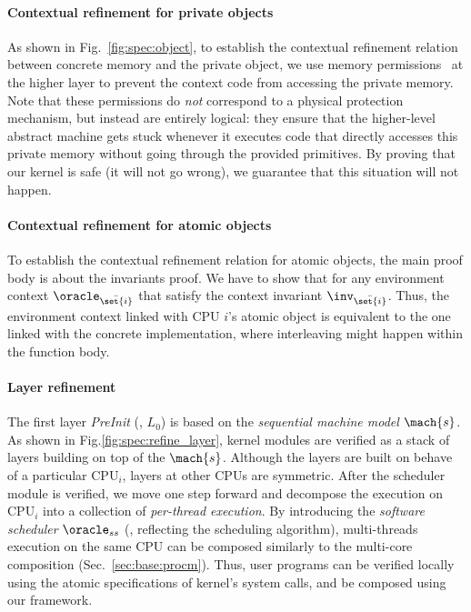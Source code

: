 {\paragraph{Contextual refinement for private objects}
As shown in Fig.~\ref{fig:spec:object},
to establish the contextual refinement relation
between concrete memory and the private object,
we use memory permissions~\cite{leroy08} at the higher layer
to prevent the context code
from accessing the private memory.
Note that these permissions do \emph{not}
correspond to a physical protection mechanism,
but instead are entirely logical:
they ensure that the higher-level abstract machine
gets stuck whenever it executes
code that directly accesses this private memory without going through the provided
primitives. By proving that our kernel is safe (it will not go wrong),
we guarantee that this situation will not happen.

\paragraph{Contextual refinement for atomic objects}
To establish the contextual refinement relation
for atomic objects, the main proof body is about the invariants proof.
We have to show that for any environment context $\oracle_{\bar{\set{i}}}$
that satisfy the context invariant $\inv_{\bar{\set{i}}}$.
Thus, the environment context linked with CPU $i$'s atomic object
is equivalent to the one linked with the concrete implementation,
where interleaving might happen within the function body.

\paragraph{Layer refinement}


The first layer \emph{PreInit} (\ie, $L_0$)
is based on the \emph{sequential machine model} $\mach{s}$.
As shown in Fig.\ref{fig:spec:refine_layer},
kernel modules
are verified as a stack of layers
building 
on top of the $\mach{s}$.
Although the layers are built
on behave of a particular $\text{CPU}_i$,
layers at other CPUs are symmetric.
After the scheduler module is verified,
we move one step forward
and decompose the execution on $\text{CPU}_i$
into a collection of \emph{per-thread execution}.
By introducing the \emph{software scheduler}
$\oracle_{ss}$ (\ie, reflecting the scheduling algorithm),
multi-threads execution on the same CPU 
can be composed similarly to the multi-core composition
(\cf Sec.~\ref{sec:base:procm}).
Thus, user programs can be verified
locally using the atomic specifications of kernel's
system calls,
and be composed using our framework.

}


